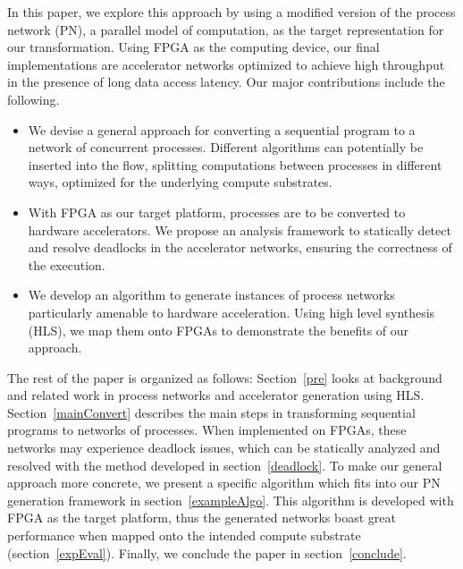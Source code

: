 \documentclass{sig-alternate}
\begin{document}
In this paper, we explore this approach by using a modified version of the process network (PN), a parallel model of computation, as the target representation for our transformation.
Using FPGA as the computing device, our final implementations are accelerator networks optimized to achieve high throughput in the presence of long data access latency.
Our major contributions include the following.
\begin{itemize}
    \item We devise a general approach for converting a sequential program to a network
of concurrent processes. Different algorithms can potentially be inserted into the flow, splitting computations between processes in different ways, optimized for the underlying compute substrates.
    \item With FPGA as our target platform, processes are to be converted to hardware accelerators. We
    propose an analysis framework to statically detect and resolve deadlocks in the accelerator networks, ensuring the correctness of the execution. 
    \item We develop an algorithm to generate instances of process networks
particularly amenable to hardware acceleration. Using high level synthesis (HLS), we map them onto FPGAs
to demonstrate the benefits of our approach. 
\end{itemize}

The rest of the paper is organized as follows:
Section~\ref{pre} looks at background and related work in process networks
and accelerator generation using HLS. Section~\ref{mainConvert} describes the main steps in transforming sequential programs
to networks of processes. When implemented on FPGAs, these networks may experience deadlock issues, which can be statically analyzed and resolved with the method developed in section~\ref{deadlock}. To make our general approach more concrete, we present a specific algorithm which fits into our PN generation framework in section~\ref{exampleAlgo}.
This algorithm is developed with FPGA as the target platform, thus the generated networks boast great performance when mapped onto the intended 
compute substrate (section~\ref{expEval}). Finally, we conclude the paper in section~\ref{conclude}.
\end{document}
